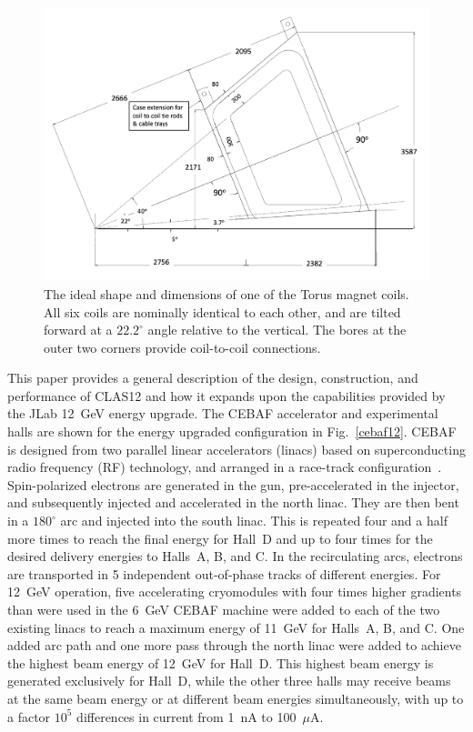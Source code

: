 \documentclass[final,3p,twocolumn]{elsarticle}
\begin{document}
\begin{figure}[htbp!]
\centerline{\includegraphics[width=1.70\columnwidth]{clas12_desired.png}}
\caption{The ideal shape and dimensions of one of the Torus magnet coils. All six coils are nominally identical to each
other, and are tilted forward at a $22.2^\circ$ angle relative to the vertical. The bores at the outer two corners
provide coil-to-coil connections.}
\label{coil-shape}
\end{figure}


This paper provides a general description of the design, construction, and performance of CLAS12 and how it expands
upon the capabilities provided by the JLab 12~GeV energy upgrade. The CEBAF accelerator and experimental halls
are shown for the energy upgraded configuration in Fig.~\ref{cebaf12}. CEBAF is designed from two parallel linear
accelerators (linacs) based on superconducting radio frequency (RF) technology, and arranged in a race-track
configuration~\cite{Leemann:2001dg}. Spin-polarized electrons are generated in the gun, pre-accelerated in the
injector, and subsequently injected and accelerated in the north linac. They are then bent in a $180^\circ$ arc and
injected into the south linac. This is repeated four and a half more times to reach the final energy for Hall~D and up to
four times  for the desired delivery energies to Halls~A, B, and C. In the recirculating arcs, electrons are transported
in 5 independent out-of-phase tracks of different energies. For 12~GeV operation, five accelerating cryomodules with
four times higher gradients than were used in the 6~GeV CEBAF machine were added to each of the two existing linacs
to reach a maximum energy of 11~GeV for Halls~A, B, and C. One added arc path and one more pass through the north
linac were added to achieve the highest beam energy of 12~GeV for Hall~D. This highest beam energy is generated
exclusively for Hall~D, while the other three halls may receive beams at the same beam energy or at different beam
energies simultaneously, with up to a factor $10^5$ differences in current from 1~nA to 100~$\mu$A.
\end{document}
